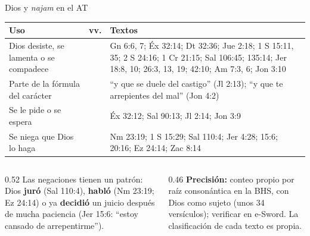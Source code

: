 \documentclass[hyperref={bookmarks=false},aspectratio=169]{beamer}
\newcommand{\destacar}[1]{\textbf{\textcolor{azul}{#1}}}
\newcommand{\precision}[1]{{\footnotesize\color{gris}\textbf{Precisión:} #1}}
\begin{document}
\begin{frame}{Dios y \emph{najam} en el AT}
\scriptsize\renewcommand{\arraystretch}{1.16}
\begin{tabular}{@{}>{\RaggedRight\arraybackslash}p{2.6cm}>{\RaggedRight\arraybackslash}p{0.7cm}>{\RaggedRight\arraybackslash}p{8.5cm}@{}}
\toprule
\textbf{Uso} & \textbf{vv.} & \textbf{Textos} \\ \midrule
Dios desiste, se lamenta o se compadece & 20 & Gn 6:6, 7; Éx 32:14; Dt 32:36; Jue 2:18; 1 S 15:11, 35; 2 S 24:16; 1 Cr 21:15; Sal 106:45; 135:14; Jer 18:8, 10; 26:3, 13, 19; 42:10; Am 7:3, 6; Jon 3:10 \\
Parte de la fórmula del carácter & 2 & ``y que se duele del castigo'' (Jl 2:13); ``y que te arrepientes del mal'' (Jon 4:2) \\
Se le pide o se espera & 4 & Éx 32:12; Sal 90:13; Jl 2:14; Jon 3:9 \\
Se niega que Dios lo haga & 8 & Nm 23:19; 1 S 15:29; Sal 110:4; Jer 4:28; 15:6; 20:16; Ez 24:14; Zac 8:14 \\
\bottomrule
\end{tabular}\par\medskip
\begin{columns}[t,onlytextwidth]
\begin{column}{0.52\textwidth}\small
Las negaciones tienen un patrón: Dios \destacar{juró} (Sal 110:4), \destacar{habló} (Nm 23:19; Ez 24:14) o ya \destacar{decidió} un juicio después de mucha paciencia (Jer 15:6: ``estoy cansado de arrepentirme'').
\end{column}
\begin{column}{0.46\textwidth}
\precision{conteo propio por raíz consonántica en la BHS, con Dios como sujeto (unos 34 versículos); verificar en e-Sword. La clasificación de cada texto es propia.}
\end{column}
\end{columns}
\end{frame}
\end{document}
